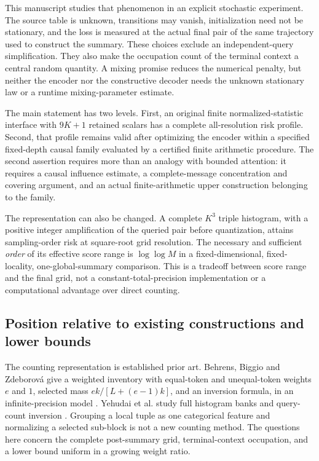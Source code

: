 \documentclass[11pt,letterpaper]{article}
\theoremstyle{definition}\newtheorem{definition}[theorem]{Definition}
\theoremstyle{remark}\newtheorem{remark}[theorem]{Remark}
\begin{document}
This manuscript studies that phenomenon in an explicit stochastic experiment. The source table is unknown, transitions may vanish, initialization need not be stationary, and the loss is measured at the actual final pair of the same trajectory used to construct the summary. These choices exclude an independent-query simplification. They also make the occupation count of the terminal context a central random quantity. A mixing promise reduces the numerical penalty, but neither the encoder nor the constructive decoder needs the unknown stationary law or a runtime mixing-parameter estimate.

The main statement has two levels. First, an original finite normalized-statistic interface with $9K+1$ retained scalars has a complete all-resolution risk profile. Second, that profile remains valid after optimizing the encoder within a specified fixed-depth causal family evaluated by a certified finite arithmetic procedure. The second assertion requires more than an analogy with bounded attention: it requires a causal influence estimate, a complete-message concentration and covering argument, and an actual finite-arithmetic upper construction belonging to the family.

The representation can also be changed. A complete $K^3$ triple histogram, with a positive integer amplification of the queried pair before quantization, attains sampling-order risk at square-root grid resolution. The necessary and sufficient \emph{order} of its effective score range is $\log\log M$ in a fixed-dimensional, fixed-locality, one-global-summary comparison. This is a tradeoff between score range and the final grid, not a constant-total-precision implementation or a computational advantage over direct counting.

\subsection{Position relative to existing constructions and lower bounds}
The counting representation is established prior art. Behrens, Biggio and Zdeborov\'a give a weighted inventory with equal-token and unequal-token weights $e$ and $1$, selected mass $ek/[L+(e-1)k]$, and an inversion formula, in an infinite-precision model \citep[Appendix B.3]{behrens2025}. Yehudai et al. study full histogram banks and query-count inversion \citep[Sections 4.1--4.2]{yehudai2026}. Grouping a local tuple as one categorical feature and normalizing a selected sub-block is not a new counting method. The questions here concern the complete post-summary grid, terminal-context occupation, and a lower bound uniform in a growing weight ratio.
\end{document}
